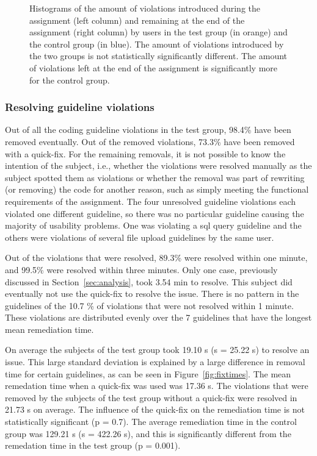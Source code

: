 \begin{figure}
  \caption[]{Histograms of the amount of violations introduced during the assignment (left column) and remaining at the end of the assignment (right column) by users in the test group (in orange) and the control group (in blue). The amount of violations introduced by the two groups is not statistically significantly different. The amount of violations left at the end of the assignment is significantly more for the control group.}
  \label{fig:hist-control-test}
\end{figure}

\subsubsection{Resolving guideline violations}
Out of all the coding guideline violations in the test group, 98.4\% have been removed eventually.
Out of the removed violations, 73.3\% have been removed with a quick-fix.
For the remaining removals, it is not possible to know the intention of the subject, i.e., whether the violations were resolved manually as the subject spotted them as violations or whether the removal was part of rewriting (or removing) the code for another reason, such as simply meeting the functional requirements of the assignment.
The four unresolved guideline violations each violated one different guideline, so there was no particular guideline causing the majority of usability problems.
One was violating a \gls{sql} query guideline and the others were violations of several file upload guidelines by the same user.

Out of the violations that were resolved, 89.3\% were resolved within one minute, and 99.5\% were resolved within three minutes.
Only one case, previously discussed in Section~\ref{sec:analysis}, took 3.54 min to resolve.
This subject did eventually not use the quick-fix to resolve the issue.
There is no pattern in the guidelines of the 10.7 \% of violations that were not resolved within 1 minute.
These violations are distributed evenly over the 7 guidelines that have the longest mean remediation time.

On average the subjects of the test group took 19.10 s (s = 25.22 s) to resolve an issue.
This large standard deviation is explained by a large difference in removal time for certain guidelines, as can be seen in Figure~\ref{fig:fixtimes}.
The mean remedation time when a quick-fix was used was 17.36 s.
The violations that were removed by the subjects of the test group without a quick-fix were resolved in 21.73 s on average.
The influence of the quick-fix on the remediation time is not statistically significant (p = 0.7).
The average remediation time in the control group was 129.21 s (s = 422.26 s), and this is significantly different from the remedation time in the test group (p = 0.001).

